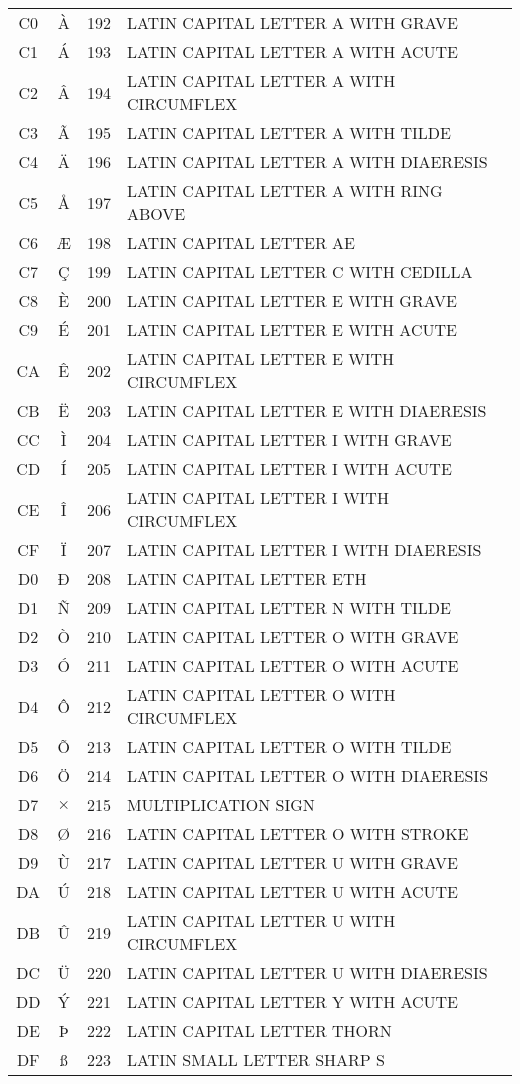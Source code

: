 \documentclass[10pt]{article}
\begin{document}
\pagebreak
\begin{tabular}{ccrl}
C0&À&192&LATIN CAPITAL LETTER A WITH GRAVE\\
C1&Á&193&LATIN CAPITAL LETTER A WITH ACUTE\\
C2&Â&194&LATIN CAPITAL LETTER A WITH CIRCUMFLEX\\
C3&Ã&195&LATIN CAPITAL LETTER A WITH TILDE\\
C4&Ä&196&LATIN CAPITAL LETTER A WITH DIAERESIS\\
C5&Å&197&LATIN CAPITAL LETTER A WITH RING ABOVE\\
C6&Æ&198&LATIN CAPITAL LETTER AE\\
C7&Ç&199&LATIN CAPITAL LETTER C WITH CEDILLA\\
C8&È&200&LATIN CAPITAL LETTER E WITH GRAVE\\
C9&É&201&LATIN CAPITAL LETTER E WITH ACUTE\\
CA&Ê&202&LATIN CAPITAL LETTER E WITH CIRCUMFLEX\\
CB&Ë&203&LATIN CAPITAL LETTER E WITH DIAERESIS\\
CC&Ì&204&LATIN CAPITAL LETTER I WITH GRAVE\\
CD&Í&205&LATIN CAPITAL LETTER I WITH ACUTE\\
CE&Î&206&LATIN CAPITAL LETTER I WITH CIRCUMFLEX\\
CF&Ï&207&LATIN CAPITAL LETTER I WITH DIAERESIS\\
D0&Ð&208&LATIN CAPITAL LETTER ETH\\
D1&Ñ&209&LATIN CAPITAL LETTER N WITH TILDE\\
D2&Ò&210&LATIN CAPITAL LETTER O WITH GRAVE\\
D3&Ó&211&LATIN CAPITAL LETTER O WITH ACUTE\\
D4&Ô&212&LATIN CAPITAL LETTER O WITH CIRCUMFLEX\\
D5&Õ&213&LATIN CAPITAL LETTER O WITH TILDE\\
D6&Ö&214&LATIN CAPITAL LETTER O WITH DIAERESIS\\
D7&$×$&215&MULTIPLICATION SIGN\\
D8&Ø&216&LATIN CAPITAL LETTER O WITH STROKE\\
D9&Ù&217&LATIN CAPITAL LETTER U WITH GRAVE\\
DA&Ú&218&LATIN CAPITAL LETTER U WITH ACUTE\\
DB&Û&219&LATIN CAPITAL LETTER U WITH CIRCUMFLEX\\
DC&Ü&220&LATIN CAPITAL LETTER U WITH DIAERESIS\\
DD&Ý&221&LATIN CAPITAL LETTER Y WITH ACUTE\\
DE&Þ&222&LATIN CAPITAL LETTER THORN\\
DF&ß&223&LATIN SMALL LETTER SHARP S\\
\end{tabular}
\end{document}
